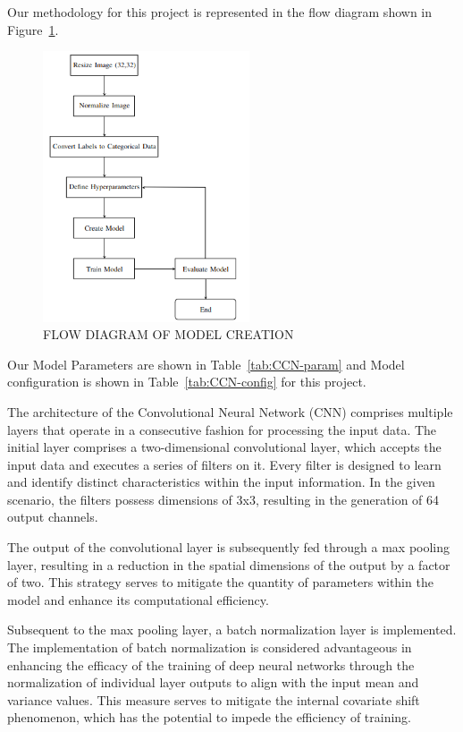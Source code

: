 \documentclass[conference]{IEEEtran}
\begin{document}
Our methodology for this project is represented in the flow diagram shown in Figure~\ref{Fig:Figure2}. 

\begin{figure}[t!]
\centering
 \includegraphics[height=8cm]{Images/flowchart.png}
\caption{FLOW DIAGRAM OF MODEL CREATION}
\label{Fig:Figure2}
\end{figure}

Our Model Parameters are shown in Table~\ref{tab:CCN-param} and Model configuration is shown in Table~\ref{tab:CCN-config} for this project. 

The architecture of the Convolutional Neural Network (CNN) comprises multiple layers that operate in a consecutive fashion for processing the input data. The initial layer comprises a two-dimensional convolutional layer, which accepts the input data and executes a series of filters on it. Every filter is designed to learn and identify distinct characteristics within the input information. In the given scenario, the filters possess dimensions of 3x3, resulting in the generation of 64 output channels.

The output of the convolutional layer is subsequently fed through a max pooling layer, resulting in a reduction in the spatial dimensions of the output by a factor of two. This strategy serves to mitigate the quantity of parameters within the model and enhance its computational efficiency.

Subsequent to the max pooling layer, a batch normalization layer is implemented. The implementation of batch normalization is considered advantageous in enhancing the efficacy of the training of deep neural networks through the normalization of individual layer outputs to align with the input mean and variance values. This measure serves to mitigate the internal covariate shift phenomenon, which has the potential to impede the efficiency of training.
\end{document}
